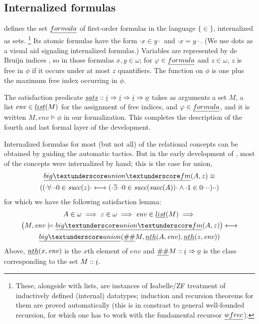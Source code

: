 \subsection{Internalized formulas}
\label{sec:internalized-formulas}

 defines the set $\formula$ of first-order 
formulas in the language $\{ \in \}$, internalized as sets.%
\footnote{These, alongside with lists, are instances of
Isabelle/ZF treatment of inductively defined (internal) datatypes;
induction and recursion theorems for them are proved automatically
(this is in constrast to general well-founded recursion, for which
one has to work with the fundamental recursor $\isa{wfrec}$).}  Its
atomic formulas have the form $\cdot x \in y\cdot$ and $\cdot x =
y\cdot$. (We use dots as a visual aid signaling internalized formulas.)
Variables are represented by de Bruijn indices \cite{MR0321704}, so in
those formulas $x,y \in \omega$; for $\phi\in\formula$ and
$z\in\omega$, $z$ is free in $\phi$ if it occurs under at most $z$
quantifiers. The  function on $\phi$ is one plus the
maximum free index occurring in $\phi$.

The satisfaction predicate
$\isa{sats}::\tyi\fun\tyi\fun\tyi\fun\tyo$ takes as arguments a set
$M$, a list $\mathit{env}\in\isa{list}(M)$ for the assignment of
free indices, and $\phi\in\formula$, and it is written
$M,\mathit{env}\models\phi$ in our formalization.
This completes the
description of the fourth and last formal layer of the development.

Internalized formulas for most (but not all) of the relational
concepts can be obtained by guiding the automatic tactics. But in the
early development of 
, most of the concepts were internalized by
hand; this is the case for union,
\begin{multline*}
  \isa{big{\uscore}union{\uscore}fm}(A,z) \equiv \\
  (({\cdot}\forall{\cdot}\,{\cdot}0 \in \mathit{succ}(z){\cdot} \longleftrightarrow
  ({\cdot}\exists{\cdot}\,{\cdot}0 \in \mathit{succ}(\mathit{succ}(A)){\cdot} \land {\cdot}1 \in
  0{\cdot}\,{\cdot}{\cdot}){\cdot}{\cdot})
\end{multline*}
for which we have the following satisfaction lemma:
\begin{multline}\label{eq:sats_big_union_fm}
  A \in \omega \implies z \in \omega \implies \mathit{env} \in \isa{list}(M)
  \implies \\
  \bigl(M, \mathit{env} \models \isa{big{\uscore}union{\uscore}fm}(A,z)\bigr)%
  \longleftrightarrow \\
  \isa{big{\uscore}union}(\isa{\#\#} M, \isa{nth}(A,
  \mathit{env}), \isa{nth}(z, \mathit{env}))
\end{multline}
Above, $\isa{nth}(x,\mathit{env})$ is the $x$th element of $\mathit{env}$
and $\isa{\#\#}M::\tyi\fun \tyo$ is the class corresponding to the
set $M::\tyi$.


